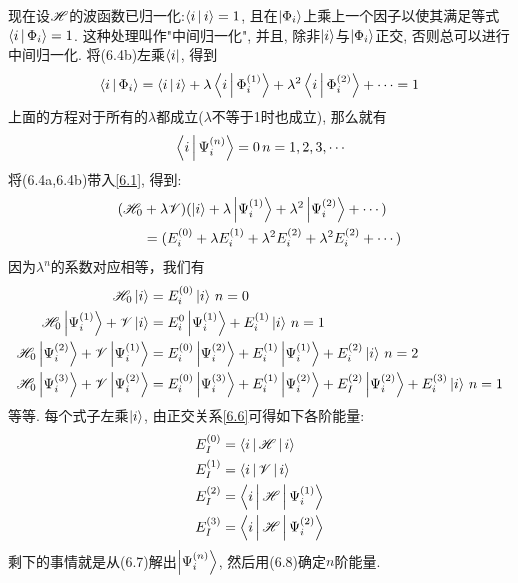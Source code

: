 现在设$\mathscr{H}$的波函数已归一化:$\Braket{i|i}=1$, 且在$\Ket{\Phi_i}$上乘上一个因子以使其满足等式$\Braket{i|\Phi_i}=1$. 这种处理叫作"中间归一化", 并且, 除非$\Ket{i}$与$\Ket{\Phi_i}$正交, 否则总可以进行中间归一化. 将(6.4b)左乘$\Bra{i}$, 得到
\begin{align}
\Braket{i|\Phi_i}=\Braket{i|i}+\lambda\Braket{i|\Phi_i^{(1)}}+\lambda^2\Braket{i|\Phi_i^{(2)}} + \cdots = 1
\end{align}
上面的方程对于所有的$\lambda$都成立($\lambda$不等于1时也成立), 那么就有
\begin{align}
\Braket{i|\Psi_i^{(n)}} = 0\, n=1,2,3,\cdots
\end{align}
将(6.4a,6.4b)带入\ref{6.1}, 得到:
\begin{align*}
(\mathscr{H}_0&+\lambda\mathscr{V})(\Ket{i}+\lambda\Ket{\Psi_i^{(1)}} + \lambda^2 \Ket{\Psi_i^{(2)}} +\cdots )\\
&=(E_i^{(0)} + \lambda E_i^{(1)} + \lambda^2 E_i^{(2)} + \lambda^2 E_i^{(2)} + \cdots )
\end{align*}
因为$\lambda^n$的系数对应相等，我们有
\begin{subequations}
	\begin{align}
\mathscr{H}_0\Ket{i}&=E_i^{(0)}\Ket{i}\, n=0\\
\mathscr{H}_0\Ket{\Psi_i^{(1)}} + \mathscr{V}\Ket{i}& = E_i^{0}\Ket{\Psi_i^{(1)}} + E_i^{(1)}\Ket{i}\, n=1 \\
\mathscr{H}_0\Ket{\Psi_i^{(2)}}+\mathscr{V}\Ket{\Psi_i^{(1)}} & = E_i^{(0)}\Ket{\Psi_i^{(2)}} + E_i^{(1)}\Ket{\Psi_i^{(1)}} + E_i^{(2)}\Ket{i} \, n=2 \\
\mathscr{H}_0\Ket{\Psi_i^{(3)}}+\mathscr{V}\Ket{\Psi_i^{(2)}} & = E_i^{(0)}\Ket{\Psi_i^{(3)}} + E_i^{(1)}\Ket{\Psi_i^{(2)}} + E_I^{(2)}\Ket{\Psi_i^{(2)}} +E_i^{(3)}\Ket{i}\, n=1
	\end{align}
\end{subequations}
等等. 每个式子左乘$\Ket{i}$, 由正交关系\ref{6.6}可得如下各阶能量:
\begin{subequations}
\begin{align}
E_I^{(0)} &= \Braket{i|\mathscr{H}|i} \\
E_I^{(1)} &= \Braket{i|\mathscr{V}|i} \\
E_I^{(2)} &= \Braket{i|\mathscr{H}|\Psi_i^{(1)}} \\
E_I^{(3)} &= \Braket{i|\mathscr{H}|\Psi_i^{(2)}}
\end{align}
\end{subequations}
剩下的事情就是从(6.7)解出$\Ket{\Psi_i^{(n)}}$, 然后用(6.8)确定$n$阶能量.

